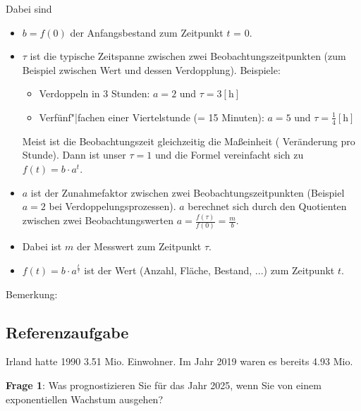 Dabei sind
\begin{itemize}
\item $b=f(0)$ der Anfangsbestand zum Zeitpunkt $t$ = 0.
\item $\tau$ ist die typische Zeitspanne zwischen zwei Beobachtungszeitpunkten (zum Beispiel zwischen Wert und dessen Verdopplung). Beispiele:
  \begin{itemize}
  \item Verdoppeln in 3 Stunden: $a=2$ und $\tau = 3 [\text{h}]$
  \item Verfünf"|fachen einer Viertelstunde (= 15 Minuten): $a=5$ und
    $\tau=\frac{1}{4} [\text{h}]$
  \end{itemize}
  Meist ist die Beobachtungszeit gleichzeitig die Maßeinheit (\zB
  Veränderung pro Stunde). Dann ist unser $\tau=1$ und die Formel
  vereinfacht sich zu $f(t) = b\cdot{}a^t$.
\item $a$ ist der Zunahmefaktor zwischen zwei Beobachtungszeitpunkten (Beispiel $a=2$ bei Verdoppelungsprozessen).
  $a$ berechnet sich durch den Quotienten zwischen zwei
  Beobachtungswerten $a = \frac{f(\tau)}{f(0)} =\frac{m}{b}$.
\item
  Dabei ist $m$ der Messwert zum Zeitpunkt $\tau$.
\item $f(t)=b\cdot{}a^{\frac{t}{\tau}}$ ist der Wert (Anzahl, Fläche,
  Bestand, ...) zum Zeitpunkt
  $t$. 
\end{itemize}

Bemerkung: 
\newpage

\subsection{Referenzaufgabe}
Irland hatte 1990 3.51 Mio. Einwohner. Im Jahr 2019 waren es bereits 4.93 Mio.

\textbf{Frage 1}: Was prognostizieren Sie für das Jahr 2025, wenn Sie von einem exponentiellen Wachstum ausgehen?


